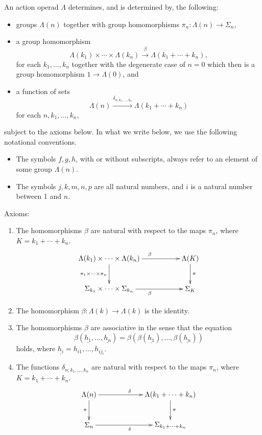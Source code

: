 \begin{thm}\label{thm:charAOp}
An action operad $\Lambda$ determines, and is determined by, the following: 
\begin{itemize}
\item groups $\Lambda(n)$ together with group homomorphisms $\pi_{n} \colon \Lambda(n) \rightarrow \Sigma_{n}$,
\item a group homomorphism
  \[
    \Lambda(k_{1}) \times \cdots \times \Lambda(k_{n}) \stackrel{\beta}{\longrightarrow} \Lambda(k_{1} + \cdots + k_{n}),
  \]
for each $k_{1}, \ldots, k_{n}$ together with the degenerate case of $n=0$ which then is a group homomorphism $1 \rightarrow \Lambda(0)$, and
\item a function of sets
  \[
    \Lambda(n) \stackrel{\delta_{n; k_{1}, \ldots, k_{n}}}{\longrightarrow} \Lambda(k_{1} + \cdots + k_{n})
  \]
for each $n, k_{1}, \ldots, k_{n}$,
\end{itemize}
subject to the axioms below. In what we write below, we use the following notational conventions.
\begin{itemize}
\item The symbols $f,g,h$, with or without subscripts, always refer to an element of some group $\Lambda(n)$.
\item The symbols $j,k,m,n,p$ are all natural numbers, and $i$ is a natural number between 1 and $n$.
\end{itemize}
Axioms:
\begin{enumerate}
\item\label{eq1} The homomorphisms $\beta$ are natural with respect to the maps $\pi_{n}$, where $K = k_{1} + \cdots + k_{n}$.
  \[
    \xy
      (0,0)*+{\Lambda(k_{1}) \times \cdots \times \Lambda(k_{n}) } ="00";
      (0,-15)*+{\Sigma_{k_{1}} \times \cdots \times \Sigma_{k_{n}}  } ="01";
      (40,0)*+{\Lambda(K) } ="20";
      (40,-15)*+{\Sigma_{K} } ="21";
      {\ar^{\beta} "00" ; "20"};
      {\ar^{\pi} "20" ; "21"};
      {\ar_{\pi_1 \times \cdots \times \pi_n} "00" ; "01"};
      {\ar_{\beta} "01" ; "21"};
    \endxy
  \]

\item\label{eq2} The homomorphism $\beta \colon \Lambda(k) \rightarrow \Lambda(k)$ is the identity.
\item\label{eq3} The homomorphisms $\beta$ are associative in the sense that the equation
\[
  \beta(\underline{h_1},\ldots,\underline{h_n}) = \beta(\beta(\underline{h_1}),\ldots,\beta(\underline{h_n}))
\]
holds, where $\underline{h_i} = h_{i1},\ldots,h_{ij_i}$.
\item\label{eq4} The functions $\delta_{n; k_{1}, \ldots, k_{n}}$ are natural with respect to the maps $\pi_{n}$, where $K = k_1 + \cdots + k_n$.
  \[
    \xy
      (0,0)*+{\Lambda(n)} ="00";
      (40,0)*+{\Lambda(k_{1} + \cdots + k_{n}) } ="20";
      (0,-15)*+{\Sigma_{n}  } ="01";
      (40,-15)*+{\Sigma_{k_{1} + \cdots + k_{n}} } ="21";
      {\ar^{\delta} "00" ; "20"};
      {\ar^{\pi} "20" ; "21"};
      {\ar_{\pi} "00" ; "01"};
      {\ar_{\delta} "01" ; "21"};
    \endxy
  \]



\end{enumerate}
\end{thm}
